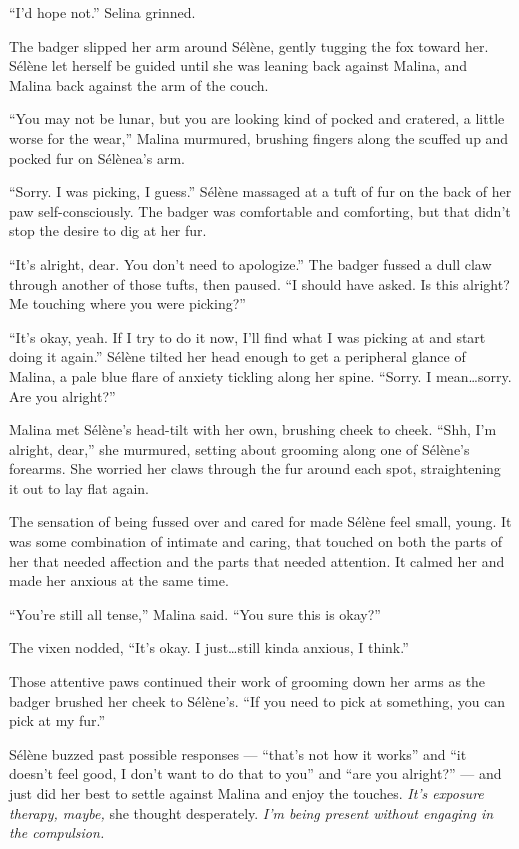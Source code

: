 ``I'd hope not.'' Selina grinned.

The badger slipped her arm around Sélène, gently tugging the fox toward her. Sélène let herself be guided until she was leaning back against Malina, and Malina back against the arm of the couch.

``You may not be lunar, but you are looking kind of pocked and cratered, a little worse for the wear,'' Malina murmured, brushing fingers along the scuffed up and pocked fur on Sélènea's arm.

``Sorry. I was picking, I guess.'' Sélène massaged at a tuft of fur on the back of her paw self-consciously. The badger was comfortable and comforting, but that didn't stop the desire to dig at her fur.

``It's alright, dear. You don't need to apologize.'' The badger fussed a dull claw through another of those tufts, then paused. ``I should have asked. Is this alright? Me touching where you were picking?''

``It's okay, yeah. If I try to do it now, I'll find what I was picking at and start doing it again.'' Sélène tilted her head enough to get a peripheral glance of Malina, a pale blue flare of anxiety tickling along her spine. ``Sorry. I mean\ldots{}sorry. Are you alright?''

Malina met Sélène's head-tilt with her own, brushing cheek to cheek. ``Shh, I'm alright, dear,'' she murmured, setting about grooming along one of Sélène's forearms. She worried her claws through the fur around each spot, straightening it out to lay flat again.

The sensation of being fussed over and cared for made Sélène feel small, young. It was some combination of intimate and caring, that touched on both the parts of her that needed affection and the parts that needed attention. It calmed her and made her anxious at the same time.

``You're still all tense,'' Malina said. ``You sure this is okay?''

The vixen nodded, ``It's okay. I just\ldots{}still kinda anxious, I think.''

Those attentive paws continued their work of grooming down her arms as the badger brushed her cheek to Sélène's. ``If you need to pick at something, you can pick at my fur.''

Sélène buzzed past possible responses --- ``that's not how it works'' and ``it doesn't feel good, I don't want to do that to you'' and ``are you alright?'' --- and just did her best to settle against Malina and enjoy the touches. \emph{It's exposure therapy, maybe,} she thought desperately. \emph{I'm being present without engaging in the compulsion.}

